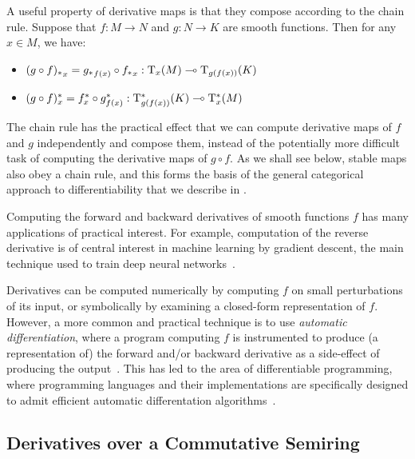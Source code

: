 \begin{remark}
  \label{rem:chain-rule}
  A useful property of derivative maps is that they compose according
  to the chain rule. Suppose that $f : M \to N$ and $g : N \to K$ are
  smooth functions. Then for any $x \in M$, we have:
  \begin{itemize}
  \item ${(g \circ f)_{*}}_x = {g_{*}}_{f(x)} \circ {f_{*}}_x : \mathrm{T}_x(M) \multimap \mathrm{T}_{g(f(x))}(K)$
  \item $(g \circ f)^{*}_x = f^{*}_x \circ g^{*}_{f(x)} : \mathrm{T}^*_{g(f(x))}(K) \multimap \mathrm{T}^*_x(M)$
  \end{itemize}
  The chain rule has the practical effect that we can compute
  derivative maps of $f$ and $g$ independently and compose them,
  instead of the potentially more difficult task of computing the
  derivative maps of $g \circ f$. As we shall see below, stable maps
  also obey a chain rule, and this forms the basis of the general
  categorical approach to differentiability that we describe in
  .
\end{remark}

Computing the forward and backward derivatives of smooth functions $f$ has many applications of practical
interest. For example, computation of the reverse derivative is of central interest in machine learning by
gradient descent, the main technique used to train deep neural networks~\cite{rumelhart88,goodfellow16}.

Derivatives can be computed numerically by computing $f$ on small perturbations of its input, or symbolically
by examining a closed-form representation of $f$. However, a more common and practical technique is to use
\emph{automatic differentiation}, where a program computing $f$ is instrumented to produce (a representation
of) the forward and/or backward derivative as a side-effect of producing the output~\cite{linnainmaa76}. This
has led to the area of differentiable programming, where programming languages and their implementations are
specifically designed to admit efficient automatic differentation
algorithms~\cite{jax2018github,abadi16,elliott17,sigal24}.

\subsection{Derivatives over a Commutative Semiring}
\label{sec:approx-as-tangents:semiring}


